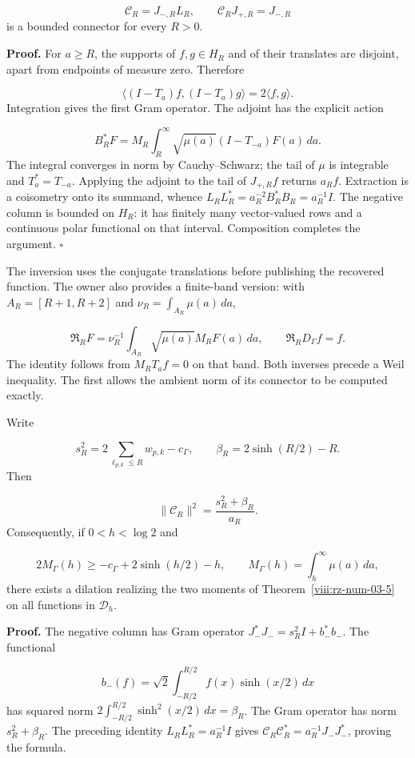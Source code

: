 \[
\mathcal C_R=J_{-,R}L_R,\qquad
\mathcal C_RJ_{+,R}=J_{-,R}
\]
is a bounded connector for every \(R>0\).

\textbf{Proof.} For \(a\geq R\), the supports of \(f,g\in H_R\) and of their translates are disjoint, apart from endpoints of measure zero. Therefore

\[
\langle(I-T_a)f,(I-T_a)g\rangle=2\langle f,g\rangle.
\]
Integration gives the first Gram operator. The adjoint has the explicit action

\[
B_R^*F=M_R\int_R^\infty\sqrt{\mu(a)}(I-T_{-a})F(a)\,da.
\]
The integral converges in norm by Cauchy–Schwarz; the tail of \(\mu\) is integrable and \(T_a^*=T_{-a}\). Applying the adjoint to the tail of \(J_{+,R}f\) returns \(a_Rf\). Extraction is a coisometry onto its summand, whence \(L_RL_R^*=a_R^{-2}B_R^*B_R=a_R^{-1}I\). The negative column is bounded on \(H_R\): it has finitely many vector-valued rows and a continuous polar functional on that interval. Composition completes the argument. \hfill\(\square\)

The inversion uses the conjugate translations before publishing the recovered function. The owner also provides a finite-band version: with \(A_R=[R+1,R+2]\) and \(\nu_R=\int_{A_R}\mu(a)\,da\),

\[
\mathfrak R_RF=\nu_R^{-1}\int_{A_R}
\sqrt{\mu(a)}M_RF(a)\,da,\qquad
\mathfrak R_RD_\Gamma f=f.
\]
The identity follows from \(M_RT_af=0\) on that band. Both inverses precede a Weil inequality. The first allows the ambient norm of its connector to be computed exactly.

Write

\[
s_R^2=2\sum_{\ell_{p,k}\leq R}w_{p,k}-c_\Gamma,\qquad
\beta_R=2\sinh(R/2)-R.
\]
Then

\[
\|\mathcal C_R\|^2=\frac{s_R^2+\beta_R}{a_R}.
\]
Consequently, if \(0<h<\log2\) and

\[
2M_\Gamma(h)\geq-c_\Gamma+2\sinh(h/2)-h,\qquad
M_\Gamma(h)=\int_h^\infty\mu(a)\,da,
\]
there exists a dilation realizing the two moments of Theorem~\ref{viii:rz-num-03-5} on all functions in \(\mathcal D_h\).

\textbf{Proof.} The negative column has Gram operator \(J_-^*J_-=s_R^2I+b_-^*b_-\). The functional

\[
b_-(f)=\sqrt2\int_{-R/2}^{R/2}f(x)\sinh(x/2)\,dx
\]
has squared norm \(2\int_{-R/2}^{R/2}\sinh^2(x/2)\,dx=\beta_R\). The Gram operator has norm \(s_R^2+\beta_R\). The preceding identity \(L_RL_R^*=a_R^{-1}I\) gives \(\mathcal C_R\mathcal C_R^*=a_R^{-1}J_-J_-^*\), proving the formula.

